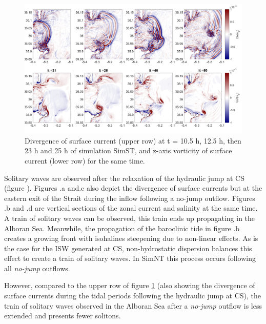 \begin{figure}[!h]
 \centering
\includegraphics[width=\linewidth]{./GBR3D/FigTourbVE2.png}
 \caption {Divergence of surface current (upper row) at t = 10.5 h, 12.5 h, then 23 h and 25 h of simulation SimST, and z-axis vorticity of surface current (lower row) for the same time.}
 \label{FigeddGBR3D}
\end{figure}

Solitary waves are observed  \color{blue}after the relaxation of the hydraulic jump at CS (figure ). Figures .a and.c also depict the divergence of surface currents but at the eastern exit of the Strait during the \color{black} inflow following a no-jump outflow. Figures .b and .d are vertical sections of the zonal current and salinity at the same time. A train of solitary waves can be observed, this train ends up propagating in the Alboran Sea. Meanwhile, the propagation of the baroclinic tide in figure .b creates a growing front \color{black} with isohalines steepening due to non-linear effects. As is the case for the ISW generated at CS, non-hydrostatic dispersion balances this effect to create a train of solitary waves. In SimNT this process occurs following all \textit{no-jump} outflows.

\color{blue}However, compared to the upper row of figure \ref{FigeddGBR3D} (also showing the divergence of surface currents during the tidal periods following the hydraulic jump at CS), the train of solitary waves observed in the Alboran Sea after a \textit{no-jump} outflow is less extended and presents fewer solitons.  \color{black}

